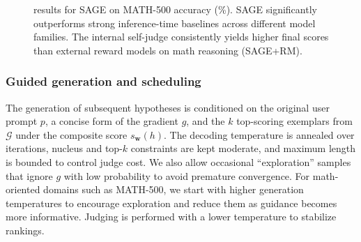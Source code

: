 \documentclass{article}
\theoremstyle{plain}
\theoremstyle{definition}
\theoremstyle{remark}
\newcommand{\method}{SAGE} %
\begin{document}

\begin{figure}[ht]
\centering
{}
\caption{results for SAGE on MATH-500 accuracy (\%). SAGE significantly outperforms strong inference-time baselines across different model families. The internal self-judge consistently yields higher final scores than external reward models on math reasoning (SAGE+RM).}
\label{fig:headline_math_single}
\end{figure}

\subsubsection{Guided generation and scheduling}
The generation of subsequent hypotheses is conditioned on the original user prompt \(p\), a concise form of the gradient \(g\), and the \(k\) top-scoring exemplars from \(\mathcal{G}\) under the composite score \(s_{\mathbf{w}}(h)\). The decoding temperature is annealed over iterations, nucleus and top-\(k\) constraints are kept moderate, and maximum length is bounded to control judge cost. We also allow occasional ``exploration'' samples that ignore \(g\) with low probability to avoid premature convergence. For math-oriented domains such as MATH-500, we start with higher generation temperatures to encourage exploration and reduce them as guidance becomes more informative. Judging is performed with a lower temperature to stabilize rankings.
\end{document}
